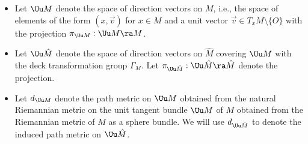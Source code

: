   

  


\begin{itemize} 
\item Let $\Uu M$ denote the space of direction vectors on $M$, i.e., 
the space of elements of the form 
$(x, \vec{v})$ for $x\in M$ and a unit vector $\vec{v} \in T_x M \setminus \{O\}$ 
with the projection $\pi_{\Uu M}: \Uu M \ra M$. 
\item Let $\Uu \hat{M}$ denote the space of direction vectors on $\hat{M}$
covering $\Uu M$ with the deck transformation group $\Gamma_M$.  
Let $\pi_{\Uu \hat{M}} : \Uu \hat{M} \ra \hat{M}$ denote the projection.
 \item  Let $d_{\Uu M}$ denote the path metric on $\Uu M$ obtained from
  the natural Riemannian metric
on the unit tangent bundle $\Uu M$ of $M$ 
obtained from the Riemannian metric of $M$
as a sphere bundle.   We will use 
$d_{\Uu \hat{M}}$ to denote the induced path metric on $\Uu \hat{M}$. 
\end{itemize} 


  
